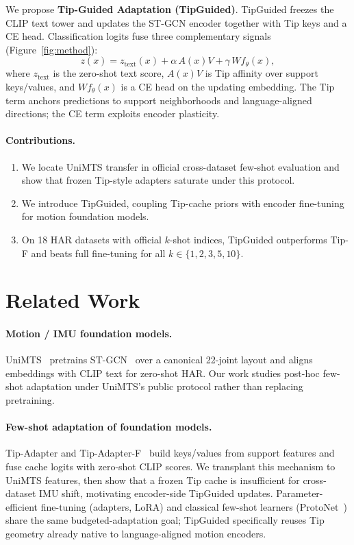 \documentclass[11pt]{article}
\begin{document}
We propose \textbf{Tip-Guided Adaptation (TipGuided)}.
TipGuided freezes the CLIP text tower and updates the ST-GCN encoder together with Tip keys and a CE head.
Classification logits fuse three complementary signals (Figure~\ref{fig:method}):
\begin{equation}
z(x)=z_{\mathrm{text}}(x)+\alpha\,A(x)V+\gamma\,W f_\theta(x),
\label{eq:fuse}
\end{equation}
where \(z_{\mathrm{text}}\) is the zero-shot text score, \(A(x)V\) is Tip affinity over support keys/values, and \(Wf_\theta(x)\) is a CE head on the updating embedding.
The Tip term anchors predictions to support neighborhoods and language-aligned directions; the CE term exploits encoder plasticity.

\paragraph{Contributions.}
\begin{enumerate}[leftmargin=1.4em,itemsep=0.2em]
\item We locate UniMTS transfer in official cross-dataset few-shot evaluation and show that frozen Tip-style adapters saturate under this protocol.
\item We introduce TipGuided, coupling Tip-cache priors with encoder fine-tuning for motion foundation models.
\item On 18 HAR datasets with official \(k\)-shot indices, TipGuided outperforms Tip-F and beats full fine-tuning for all \(k\in\{1,2,3,5,10\}\).
\end{enumerate}

\section{Related Work}
\label{sec:related}

\paragraph{Motion / IMU foundation models.}
UniMTS~\cite{unimts} pretrains ST-GCN~\cite{stgcn} over a canonical 22-joint layout and aligns embeddings with CLIP text for zero-shot HAR.
Our work studies post-hoc few-shot adaptation under UniMTS's public protocol rather than replacing pretraining.

\paragraph{Few-shot adaptation of foundation models.}
Tip-Adapter and Tip-Adapter-F~\cite{tipadapter} build keys/values from support features and fuse cache logits with zero-shot CLIP scores.
We transplant this mechanism to UniMTS features, then show that a frozen Tip cache is insufficient for cross-dataset IMU shift, motivating encoder-side TipGuided updates.
Parameter-efficient fine-tuning (adapters, LoRA) and classical few-shot learners (ProtoNet~\cite{protonet}) share the same budgeted-adaptation goal; TipGuided specifically reuses Tip geometry already native to language-aligned motion encoders.
\end{document}
